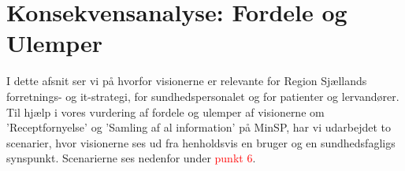 %
%
%
\section{Konsekvensanalyse: Fordele og Ulemper}
I dette afsnit ser vi på hvorfor visionerne er relevante for Region Sjællands forretnings- og it-strategi, for sundhedspersonalet og for patienter og lervandører. \\
Til hjælp i vores vurdering af fordele og ulemper af visionerne om 'Receptfornyelse' og 'Samling af al information' på MinSP, har vi udarbejdet to scenarier, hvor visionerne ses ud fra henholdsvis en bruger og en sundhedsfagligs synspunkt. Scenarierne ses nedenfor under \textcolor{red}{punkt 6}.
